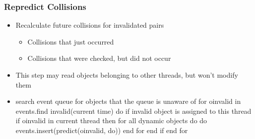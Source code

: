 \documentclass{beamer}
\begin{document}
\begin{frame}
	\frametitle{Repredict Collisions}
	\begin{itemize}
		\item Recalculate future collisions for invalidated pairs
		\begin{itemize}
			\item Collisions that just occurred
			\item Collisions that were checked, but did not occur
		\end{itemize}
		\item This step may read objects belonging to other threads, but won't modify them
		\item
{search event queue for objects that the queue is unaware of}
for oinvalid in events.find invalid(current time) do
  {if invalid object is assigned to this thread}
  if oinvalid in current thread then
    for all dynamic objects do do
      events.insert(predict(oinvalid, do))
    end for
  end if
end for
	\end{itemize}
\end{frame}







	
\end{document}
